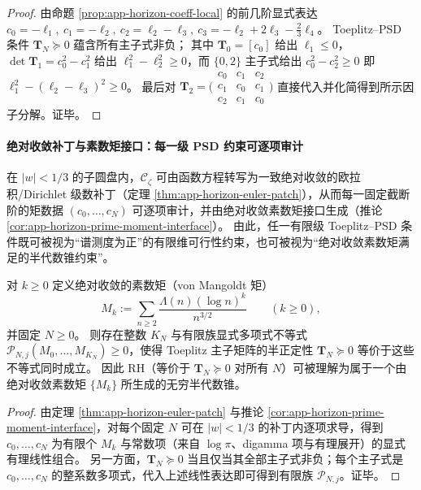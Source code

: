 \begin{proof}
由命题 \ref{prop:app-horizon-coeff-local} 的前几阶显式表达
\(
c_0=-\ell_1,\ c_1=-\ell_2,\ c_2=\ell_2-\ell_3,\ c_3=-\ell_2+2\ell_3-\tfrac23\ell_4
\)。
Toeplitz--PSD 条件 \(\mathbf{T}_N\succeq 0\) 蕴含所有主子式非负；
其中 \(\mathbf{T}_0=[c_0]\) 给出 \(\ell_1\le 0\)，\(\det\mathbf{T}_1=c_0^2-c_1^2\) 给出 \(\ell_1^2-\ell_2^2\ge 0\)，而 \(\{0,2\}\) 主子式给出 \(c_0^2-c_2^2\ge 0\) 即 \(\ell_1^2-(\ell_2-\ell_3)^2\ge 0\)。
最后对 \(\mathbf{T}_2=\bigl(\begin{smallmatrix}c_0&c_1&c_2\\ c_1&c_0&c_1\\ c_2&c_1&c_0\end{smallmatrix}\bigr)\) 直接代入并化简得到所示因子分解。证毕。
\end{proof}

\paragraph{绝对收敛补丁与素数矩接口：每一级 PSD 约束可逐项审计}
在 \(|w|<1/3\) 的子圆盘内，\(\mathscr{C}_{\zeta}\) 可由函数方程转写为一致绝对收敛的欧拉积/Dirichlet 级数补丁（定理 \ref{thm:app-horizon-euler-patch}），从而每一固定截断阶的矩数据 \((c_0,\dots,c_N)\) 可逐项审计，并由绝对收敛素数矩接口生成（推论 \ref{cor:app-horizon-prime-moment-interface}）。
由此，任一有限级 Toeplitz--PSD 条件既可被视为“谱测度为正”的有限维可行性约束，也可被视为“绝对收敛素数矩满足的半代数锥约束”。

\begin{theorem}\label{thm:xi-prime-moment-semialgebraic-cone}
对 \(k\ge 0\) 定义绝对收敛的素数矩（von Mangoldt 矩）
\[
M_k:=\sum_{n\ge 2}\frac{\Lambda(n)(\log n)^k}{n^{3/2}}\qquad(k\ge 0),
\]
并固定 \(N\ge 0\)。
则存在整数 \(K_N\) 与有限族显式多项式不等式
\(\mathcal{P}_{N,j}(M_0,\dots,M_{K_N})\ge 0\)，使得 Toeplitz 主子矩阵的半正定性
\(\mathbf{T}_N\succeq 0\)
等价于这些不等式同时成立。
因此 RH（等价于 \(\mathbf{T}_N\succeq 0\) 对所有 \(N\)）可被理解为属于一个由绝对收敛素数矩 \(\{M_k\}\) 所生成的无穷半代数锥。
\end{theorem}

\begin{proof}
由定理 \ref{thm:app-horizon-euler-patch} 与推论 \ref{cor:app-horizon-prime-moment-interface}，对每个固定 \(N\) 可在 \(|w|<1/3\) 的补丁内逐项求导，得到 \(c_0,\dots,c_N\) 为有限个 \(M_k\) 与常数项（来自 \(\log\pi\)、digamma 项与有理展开）的显式有理线性组合。
另一方面，\(\mathbf{T}_N\succeq 0\) 当且仅当其全部主子式非负；每个主子式是 \(c_0,\dots,c_N\) 的整系数多项式，代入上述线性表达即可得到有限族 \(\mathcal{P}_{N,j}\)。证毕。
\end{proof}

